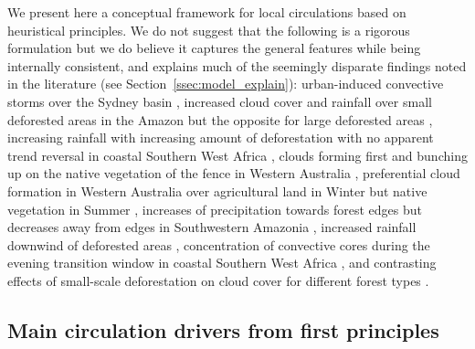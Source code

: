 We present here a conceptual framework for local circulations based on heuristical principles. We do not suggest that the following is a rigorous formulation but we do believe it captures the general features while being internally consistent, and explains much of the seemingly disparate findings noted in the literature (see Section~\ref{ssec:model_explain}): urban-induced convective storms over the Sydney basin \citep{gero2006}, increased cloud cover and rainfall over small deforested areas in the Amazon but the opposite for large deforested areas \citep{khanna2017}, increasing rainfall with increasing amount of deforestation with no apparent trend reversal in coastal Southern West Africa \citep{taylor2022}, clouds forming first and bunching up on the native vegetation of the fence in Western Australia \citep{lyons2002}, preferential cloud formation in Western Australia over agricultural land in Winter but native vegetation in Summer \citep{ray2003}, increases of precipitation towards forest edges but decreases away from edges in Southwestern Amazonia \citep{knox2011}, increased rainfall downwind of deforested areas \citep{khanna2017}, concentration of convective cores during the evening transition window in coastal Southern West Africa \citep{taylor2022}, and contrasting effects of small-scale deforestation on cloud cover for different forest types \citep{xu2022}.

\subsection{Main circulation drivers from first principles}

